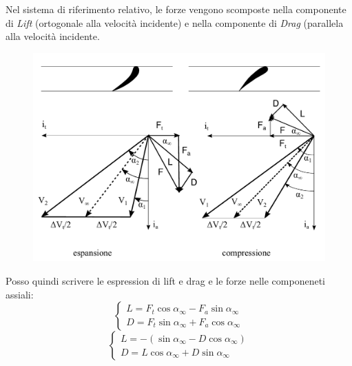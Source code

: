 Nel sistema di riferimento relativo, le forze vengono scomposte nella componente di \textit{Lift} (ortogonale alla velocità incidente) e nella componente di \textit{Drag} (parallela alla velocità incidente. 
\begin{figure}
\centering
  \includegraphics[width=.7\textwidth]{fig/triang1.pdf}
\caption{}
\label{fig:triang1}
\end{figure}
Posso quindi scrivere le espression di lift e drag e le forze nelle componeneti assiali:
\begin{equation}
	\begin{cases} 
		L = F_t \cos \alpha_{\infty} -  F_a \sin \alpha_{\infty}\\
		D = F_t \sin \alpha_{\infty} +  F_a \cos \alpha_{\infty}
	\end{cases}
\end{equation}
\begin{equation}
	\begin{cases} 
		L = - (\sin \alpha_{\infty} -  D \cos \alpha_{\infty})\\
		D = L \cos \alpha_{\infty} +  D \sin \alpha_{\infty}
	\end{cases}
\end{equation}

